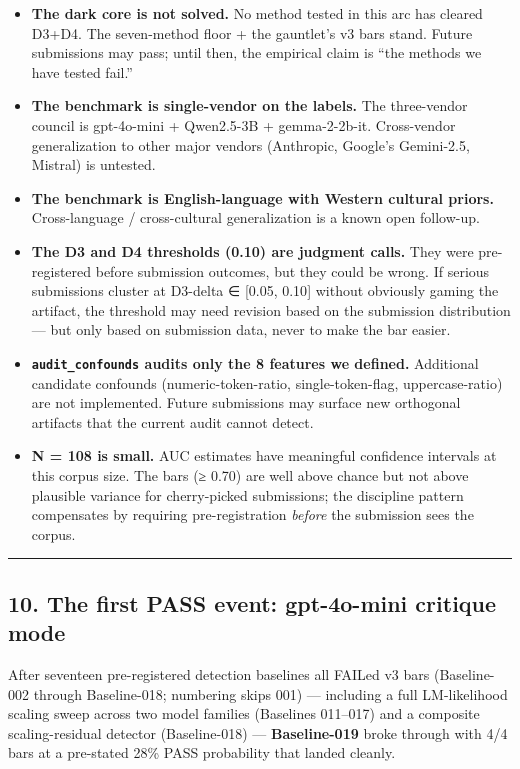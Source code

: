 \documentclass[
]{article}
\providecommand{\tightlist}{%
  \setlength{\itemsep}{0pt}\setlength{\parskip}{0pt}}
\begin{document}
\begin{itemize}
\tightlist
\item
  \textbf{The dark core is not solved.} No method tested in this arc has
  cleared D3+D4. The seven-method floor + the gauntlet's v3 bars stand.
  Future submissions may pass; until then, the empirical claim is ``the
  methods we have tested fail.''
\item
  \textbf{The benchmark is single-vendor on the labels.} The
  three-vendor council is gpt-4o-mini + Qwen2.5-3B + gemma-2-2b-it.
  Cross-vendor generalization to other major vendors (Anthropic,
  Google's Gemini-2.5, Mistral) is untested.
\item
  \textbf{The benchmark is English-language with Western cultural
  priors.} Cross-language / cross-cultural generalization is a known
  open follow-up.
\item
  \textbf{The D3 and D4 thresholds (0.10) are judgment calls.} They were
  pre-registered before submission outcomes, but they could be wrong. If
  serious submissions cluster at D3-delta ∈ {[}0.05, 0.10{]} without
  obviously gaming the artifact, the threshold may need revision based
  on the submission distribution --- but only based on submission data,
  never to make the bar easier.
\item
  \textbf{\texttt{audit\_confounds} audits only the 8 features we
  defined.} Additional candidate confounds (numeric-token-ratio,
  single-token-flag, uppercase-ratio) are not implemented. Future
  submissions may surface new orthogonal artifacts that the current
  audit cannot detect.
\item
  \textbf{N = 108 is small.} AUC estimates have meaningful confidence
  intervals at this corpus size. The bars (≥ 0.70) are well above chance
  but not above plausible variance for cherry-picked submissions; the
  discipline pattern compensates by requiring pre-registration
  \emph{before} the submission sees the corpus.
\end{itemize}

\begin{center}\rule{0.5\linewidth}{0.5pt}\end{center}

\subsection{10. The first PASS event: gpt-4o-mini critique
mode}\label{the-first-pass-event-gpt-4o-mini-critique-mode}

After seventeen pre-registered detection baselines all FAILed v3 bars
(Baseline-002 through Baseline-018; numbering skips 001) --- including a
full LM-likelihood scaling sweep across two model families (Baselines
011--017) and a composite scaling-residual detector (Baseline-018) ---
\textbf{Baseline-019} broke through with 4/4 bars at a pre-stated 28\%
PASS probability that landed cleanly.
\end{document}
